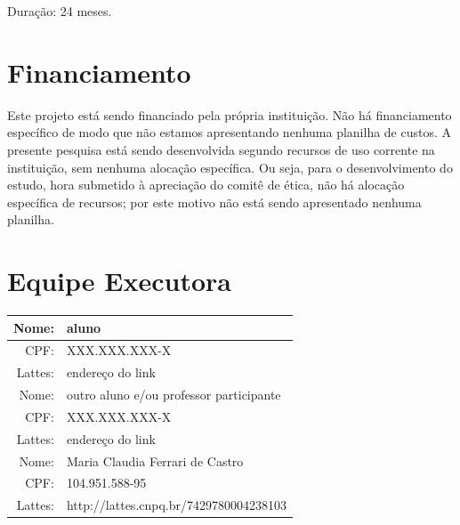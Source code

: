 \documentclass[rascunho,xindy]{Classe-Latex-FEI/fei}
\begin{document}
Duração: 24 meses.

\chapter{Financiamento}

Este projeto está sendo financiado pela própria instituição. Não há financiamento específico de modo que não estamos apresentando nenhuma planilha de custos. A presente pesquisa está sendo desenvolvida segundo recursos de uso corrente na instituição, sem nenhuma alocação específica. Ou seja, para o desenvolvimento do estudo, hora submetido à apreciação do comitê de ética, não há alocação específica de recursos; por este motivo não está sendo apresentado nenhuma planilha.

\chapter{Equipe Executora}

\begin{tabular}{| r || l |}
    \hline
        Nome:   & aluno \\ \hline
        CPF:    & XXX.XXX.XXX-X \\ \hline
        Lattes: & endereço do link \\ \hline
    \hline
        Nome:   & outro aluno e/ou professor participante \\ \hline
        CPF:    & XXX.XXX.XXX-X \\ \hline
        Lattes: & endereço do link \\ \hline
    \hline
        Nome:   & Maria Claudia Ferrari de Castro \\ \hline
        CPF:    & 104.951.588-95 \\ \hline
        Lattes: & http://lattes.cnpq.br/7429780004238103 \\
    \hline
\end{tabular}


\end{document}
